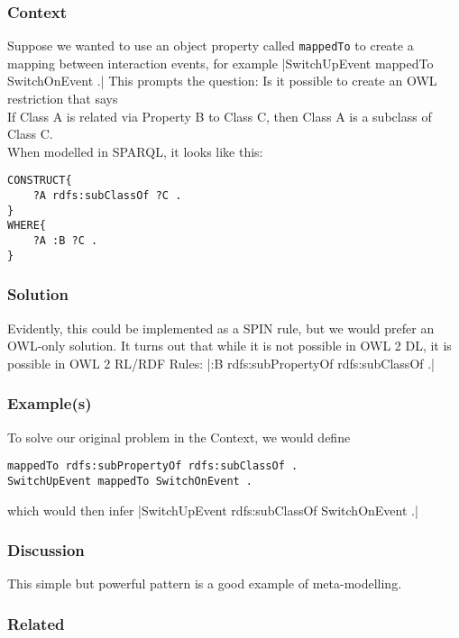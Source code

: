 \subsubsection{Context}
Suppose we wanted to use an object property called \texttt{mappedTo} to create a mapping between interaction events, for example |SwitchUpEvent mappedTo SwitchOnEvent .| This prompts the question: Is it possible to create an \ac{OWL} restriction that says\\

\noindent
If Class A is related via Property B to Class C, then Class A is a subclass of Class C.\\ 

When modelled in \ac{SPARQL}, it looks like this:

\begin{verbatim}
CONSTRUCT{
	?A rdfs:subClassOf ?C .
}
WHERE{
	?A :B ?C .
}
\end{verbatim}

\subsubsection{Solution}

Evidently, this could be implemented as a \ac{SPIN} rule, but we would prefer an \ac{OWL}-only solution. It turns out that while it is not possible in \ac{OWL} 2 DL, it is possible in \ac{OWL} 2 RL/RDF Rules: |:B rdfs:subPropertyOf rdfs:subClassOf .|

\subsubsection{Example(s)}

To solve our original problem in the Context, we would define 

\begin{verbatim}
mappedTo rdfs:subPropertyOf rdfs:subClassOf .
SwitchUpEvent mappedTo SwitchOnEvent .
\end{verbatim}

which would then infer |SwitchUpEvent rdfs:subClassOf SwitchOnEvent .|

\subsubsection{Discussion}

This simple but powerful pattern is a good example of meta-modelling.

\subsubsection{Related}

